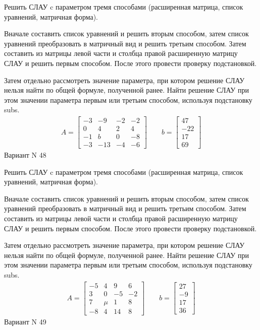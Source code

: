 \documentclass[11pt]{report}
\begin{document}
Решить СЛАУ c параметром тремя способами (расширенная матрица, список уравнений, матричная форма).

Вначале составить список уравнений и решить вторым способом,
затем список уравнений преобразовать в матричный вид и решить третьим способом.
Затем составить из матрицы левой части и столбца правой расширенную матрицу СЛАУ и решить первым способом.
После этого провести проверку подстановкой.

Затем отдельно рассмотреть значение параметра, при котором решение СЛАУ нельзя найти по общей формуле,
полученной ранее.
Найти решение СЛАУ при этом значении параметра первым или третьим способом, используя подстановку subs.
\begin{align*}
    A = \left[\begin{matrix}-3 & -9 & -2 & -2\\0 & 4 & 2 & 4\\-1 & b & 0 & -8\\-3 & -13 & -4 & -6\end{matrix}\right]
\qquad b = \left[\begin{matrix}47\\-22\\17\\69\end{matrix}\right]
\end{align*}
\newpage
Вариант N 48


Решить СЛАУ c параметром тремя способами (расширенная матрица, список уравнений, матричная форма).

Вначале составить список уравнений и решить вторым способом,
затем список уравнений преобразовать в матричный вид и решить третьим способом.
Затем составить из матрицы левой части и столбца правой расширенную матрицу СЛАУ и решить первым способом.
После этого провести проверку подстановкой.

Затем отдельно рассмотреть значение параметра, при котором решение СЛАУ нельзя найти по общей формуле,
полученной ранее.
Найти решение СЛАУ при этом значении параметра первым или третьим способом, используя подстановку subs.
\begin{align*}
    A = \left[\begin{matrix}-5 & 4 & 9 & 6\\3 & 0 & -5 & -2\\7 & \mu & 1 & 8\\-8 & 4 & 14 & 8\end{matrix}\right]
\qquad b = \left[\begin{matrix}27\\-9\\17\\36\end{matrix}\right]
\end{align*}
\newpage
Вариант N 49
\end{document}
